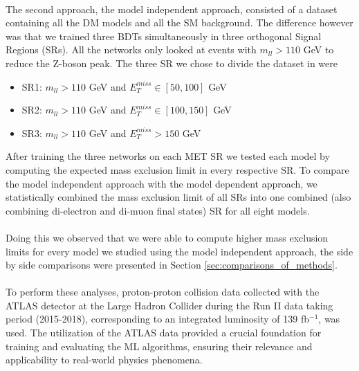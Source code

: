 \documentclass[12pt, a4paper]{book}
\begin{document}
\\The second approach, the model independent approach, consisted of a dataset containing all the DM models and all the SM background. The difference however was that we trained three BDTs simultaneously in three orthogonal Signal Regions (SRs). 
All the networks only looked at events with $m_{ll}>110$ GeV to reduce the Z-boson peak. 
The three SR we chose to divide the dataset in were 
\begin{itemize}
   \item SR1: $m_{ll} >110$ GeV and $E_T^{miss} \in [50, 100]$ GeV
   \item SR2: $m_{ll} >110$ GeV and $E_T^{miss} \in [100, 150]$ GeV
   \item SR3: $m_{ll} >110$ GeV and $E_T^{miss} >150$ GeV
\end{itemize} 
After training the three networks on each MET SR we tested each model by computing the expected mass exclusion limit in every respective SR. To compare the model independent approach with the model dependent approach, 
we statistically combined the mass exclusion limit of all SRs into one combined (also combining di-electron and di-muon final states) SR for all eight models. \\
\\Doing this we observed that we were able to compute higher mass exclusion limits for every model we studied using the model independent approach, the side by side comparisons were presented in Section \ref{sec:comparisons_of_methods}.\\
\\To perform these analyses, proton-proton collision data collected with the ATLAS detector at the Large Hadron Collider during the Run II data taking period (2015-2018), corresponding to an integrated luminosity of 139 fb$^{-1}$, was used. The utilization of the ATLAS data provided a crucial foundation for training and evaluating the ML algorithms, 
ensuring their relevance and applicability to real-world physics phenomena.
\end{document}

